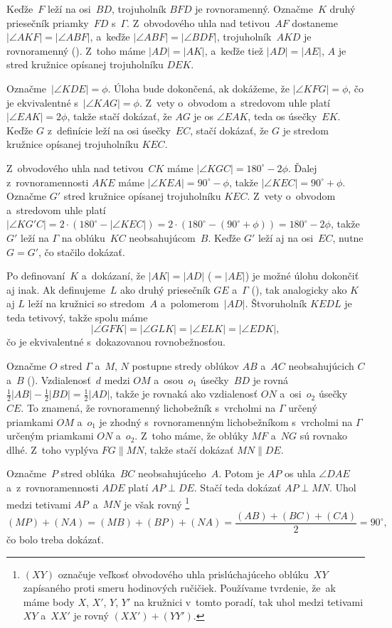 {%
Keďže~$F$ leží na osi~$BD$, trojuholník $BFD$ je rovnoramenný. Označme~$K$ druhý priesečník priamky~$FD$ s~$\Gamma$. Z~obvodového uhla nad tetivou~$AF$ dostaneme $|\angle AKF| = |\angle ABF|$, a~keďže $|\angle ABF| = |\angle BDF|$, trojuholník~$AKD$ je rovnoramenný (\obr). Z~toho máme $|AD|=|AK|$, a~keďže tiež $|AD|=|AE|$, $A$ je stred kružnice opísanej trojuholníku $DEK$.

Označme~$|\angle KDE|=\phi$. Úloha bude dokončená, ak dokážeme, že $|\angle KFG|=\phi$, čo je ekvivalentné s~$|\angle KAG|=\phi$. Z~vety o~obvodom a~stredovom uhle platí $|\angle EAK|=2 \phi$, takže stačí dokázať, že $AG$ je os $\angle EAK$, teda os úsečky~$EK$. Keďže $G$ z~definície leží na osi úsečky~$EC$, stačí dokázať, že $G$ je stredom kružnice opísanej trojuholníku $KEC$.
%

Z~obvodového uhla nad tetivou~$CK$ máme $|\angle KGC|=180^\circ-2\phi$. Ďalej z~rovnoramennosti $AKE$ máme $|\angle KEA|=90^\circ-\phi$, takže $|\angle KEC|=90^\circ+\phi$. Označme $G'$ stred kružnice opísanej trojuholníku $KEC$. Z~vety o~obvodom a~stredovom uhle platí $|\angle KG'C|=2\cdot(180^\circ-|\angle KEC|)=2\cdot(180^\circ-(90^\circ+\phi))=180^\circ-2\phi$, takže~$G'$ leží na $\Gamma$ na oblúku~$KC$ neobsahujúcom~$B$. Keďže $G'$ leží aj na osi~$EC$, nutne $G=G'$, čo stačilo dokázať.

\poznamka
Po definovaní~$K$ a~dokázaní, že $|AK|=|AD|$ ($=|AE|$) je možné úlohu dokončiť aj inak. Ak definujeme~$L$ ako druhý priesečník $GE$ a~$\Gamma$ (\obr), tak analogicky ako $K$ aj $L$ leží na kružnici so stredom~$A$ a~polomerom~$|AD|$. Štvoruholník $KEDL$ je teda tetivový, takže spolu máme
$$
|\angle GFK| = |\angle GLK| = |\angle ELK| = |\angle EDK|,
$$
čo je ekvivalentné s~dokazovanou rovnobežnosťou.

\ineriesenie
Označme $O$ stred $\Gamma$ a~$M$, $N$ postupne stredy oblúkov $AB$ a~$AC$ neobsahujúcich $C$ a~$B$ (\obr). Vzdialenosť~$d$ medzi $OM$ a~osou~$o_1$ úsečky~$BD$ je rovná $\frac12 |AB| - \frac12 |BD|=\frac12 |AD|$, takže je rovnaká ako vzdialenosť $ON$ a~osi~$o_2$ úsečky~$CE$. To znamená, že rovnoramenný lichobežník s~vrcholmi na $\Gamma$ určený priamkami $OM$ a~$o_1$ je zhodný s~rovnoramenným lichobežníkom s~vrcholmi na $\Gamma$ určeným priamkami $ON$ a~$o_2$. Z~toho máme, že oblúky $MF$ a~$NG$ sú rovnako dlhé. Z~toho vyplýva $FG \parallel MN$, takže stačí dokázať $MN \parallel DE$.

Označme~$P$ stred oblúka~$BC$ neobsahujúceho~$A$. Potom je $AP$ os uhla $\angle DAE$ a~z~rovnoramennosti $ADE$ platí $AP \perp DE$. Stačí teda dokázať $AP \perp MN$. Uhol medzi tetivami $AP$~a~$MN$ je však rovný
%
\footnote{$(XY)$ označuje veľkosť obvodového uhla prislúchajúceho oblúku~$XY$ zapísaného proti smeru hodinových ručičiek. Používame tvrdenie, že~ak máme body $X$, $X'$, $Y$, $Y'$ na kružnici v~tomto poradí, tak uhol medzi tetivami $XY$ a~$XX'$ je rovný $(XX') + (YY')$.}
%
$$
(MP)+ (NA) = (MB) + (BP) + (NA) = \frac{(AB)+(BC)+(CA)}2=90^\circ,
$$
čo bolo treba dokázať.
%

}

